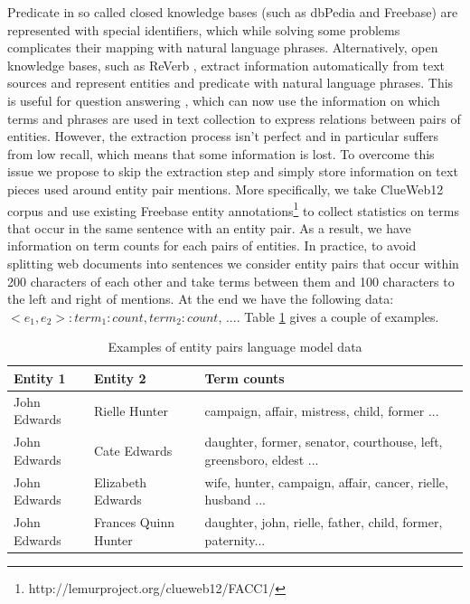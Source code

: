 Predicate in so called closed knowledge bases (such as dbPedia and Freebase) are represented with special identifiers, which while solving some problems complicates their mapping with natural language phrases.
Alternatively, open knowledge bases, such as ReVerb \cite{fader2011identifying}, extract information automatically from text sources and represent entities and predicate with natural language phrases.
This is useful for question answering \cite{Fader:2014:OQA:2623330.2623677}, which can now use the information on which terms and phrases are used in text collection to express relations between pairs of entities.
However, the extraction process isn't perfect and in particular suffers from low recall, which means that some information is lost.
To overcome this issue we propose to skip the extraction step and simply store information on text pieces used around entity pair mentions.
More specifically, we take ClueWeb12 corpus and use existing Freebase entity annotations\footnote{http://lemurproject.org/clueweb12/FACC1/} to collect statistics on terms that occur in the same sentence with an entity pair.
As a result, we have information on term counts for each pairs of entities.
In practice, to avoid splitting web documents into sentences we consider entity pairs that occur within 200 characters of each other and take terms between them and 100 characters to the left and right of mentions.
At the end we have the following data: $<e_1, e_2>: term_1: count, term_2: count$, ....
Table \ref{table:clueweb_entitypairs_langmodel} gives a couple of examples.

\begin{table}
\caption{Examples of entity pairs language model data}
\label{table:clueweb_entitypairs_langmodel}
\begin{tabular}{| p{1.25cm} | p{1.23cm} | p{4.5cm} |}
\hline
Entity 1 & Entity 2 & Term counts\\
\hline
John Edwards & Rielle Hunter & campaign, affair, mistress, child, former ...\\
\hline
John Edwards & Cate Edwards & daughter, former, senator, courthouse, left, greensboro, eldest ...\\
\hline
John Edwards & Elizabeth Edwards & wife, hunter, campaign, affair, cancer, rielle, husband ...\\
\hline
John Edwards & Frances Quinn Hunter & daughter, john, rielle, father, child, former, paternity...\\
\hline
\end{tabular}
\end{table}

